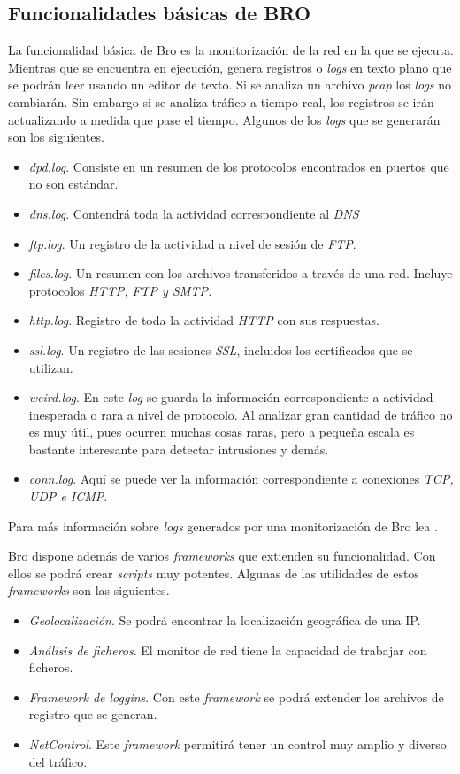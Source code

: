 \subsection{Funcionalidades básicas de BRO}

La funcionalidad básica de Bro es la monitorización de la red en la que se ejecuta. 
Mientras que se encuentra en ejecución, genera registros o \textit{logs} en texto plano que se 
podrán leer usando un editor de texto. Si se analiza un archivo \textit{pcap} los \textit{logs} no cambiarán. Sin 
embargo si se analiza tráfico a tiempo real, los registros se irán actualizando a medida que pase el tiempo. 
Algunos de los \textit{logs} que se generarán son los siguientes.

\begin{itemize}
\item \textit{dpd.log}. Consiste en un resumen de los protocolos encontrados en puertos que no son estándar.
\item \textit{dns.log}. Contendrá toda la actividad correspondiente al \textit{DNS}
\item \textit{ftp.log}. Un registro de la actividad a nivel de sesión de \textit{FTP}.
\item \textit{files.log}. Un resumen con los archivos transferidos a través de una red. Incluye 
protocolos \textit{HTTP, FTP y SMTP.}
\item \textit{http.log}. Registro de toda la actividad \textit{HTTP} con sus respuestas.
\item \textit{ssl.log}. Un registro de las sesiones \textit{SSL}, incluidos los certificados que se utilizan.
\item \textit{weird.log}. En este \textit{log} se guarda la información correspondiente a actividad 
inesperada o rara a nivel de protocolo. Al analizar gran cantidad de tráfico no es muy útil, pues ocurren 
muchas cosas raras, pero a pequeña escala es bastante interesante para detectar intrusiones y demás.
\item \textit{conn.log}. Aquí se puede ver la información correspondiente a conexiones  \textit{TCP, UDP e ICMP}.
\end{itemize}

\intro Para más información sobre \textit{logs} generados por una monitorización de Bro lea \cite{brologs}.

\intro Bro dispone además de varios \textit{frameworks} que extienden su funcionalidad. Con ellos se podrá crear \textit{scripts} muy potentes. Algunas de las utilidades de estos \textit{frameworks} son las siguientes.
\begin{itemize}
\item \textit{Geolocalización}. Se podrá encontrar la localización geográfica de una IP.
\item \textit{Análisis de ficheros}. El monitor de red tiene la capacidad de trabajar con ficheros.
\item \textit{Framework de loggins}. Con este \textit{framework} se podrá extender los archivos de registro que se generan.
\item \textit{NetControl}. Este \textit{framework} permitirá tener un control muy amplio y diverso del tráfico.
\end{itemize}

